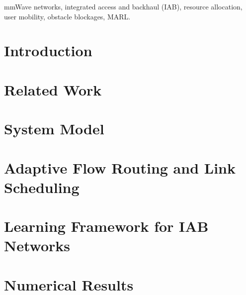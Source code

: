 \documentclass[lettersize,journal]{IEEEtran}
\begin{document}
\begin{IEEEkeywords}
mmWave networks, integrated access and backhaul (IAB), resource allocation, user mobility, obstacle blockages, MARL.
\end{IEEEkeywords}

\vspace{-10pt}
\section{Introduction}
\label{sec:introduction}


\vspace{-10pt}
\section{Related Work}
\label{related_work}


\vspace{-10pt}
\section{System Model}
\label{system_model}


\vspace{-10pt}
\section{Adaptive Flow Routing and Link Scheduling}
\label{method}


\vspace{-10pt}
\section{Learning Framework for IAB Networks}
\label{implementation_issue}


\vspace{-5pt}
\section{Numerical Results}
\label{experiments}


\vspace{-10pt}
\end{document}
